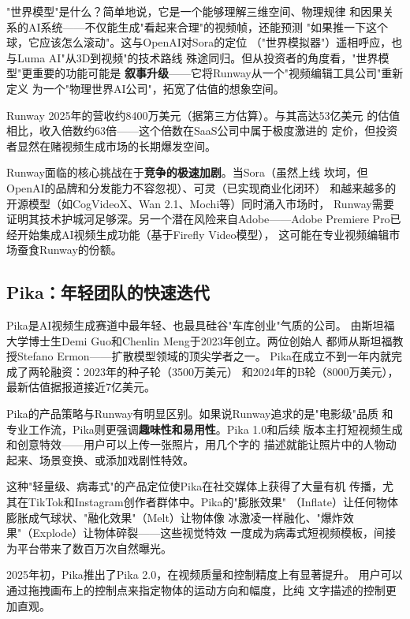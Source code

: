 "世界模型"是什么？简单地说，它是一个能够理解三维空间、物理规律
和因果关系的AI系统——不仅能生成"看起来合理"的视频帧，还能预测
"如果推一下这个球，它应该怎么滚动"。这与OpenAI对Sora的定位
（"世界模拟器"）遥相呼应，也与Luma AI"从3D到视频"的技术路线
殊途同归。但从投资者的角度看，"世界模型"更重要的功能可能是
\textbf{叙事升级}——它将Runway从一个"视频编辑工具公司"重新定义
为一个"物理世界AI公司"，拓宽了估值的想象空间。

Runway 2025年的营收约8400万美元（据第三方估算）。与其高达53亿美元
的估值相比，收入倍数约63倍——这个倍数在SaaS公司中属于极度激进的
定价，但投资者显然在赌视频生成市场的长期爆发空间。

Runway面临的核心挑战在于\textbf{竞争的极速加剧}。当Sora（虽然上线
坎坷，但OpenAI的品牌和分发能力不容忽视）、可灵（已实现商业化闭环）
和越来越多的开源模型（如CogVideoX、Wan 2.1、Mochi等）同时涌入市场时，
Runway需要证明其技术护城河足够深。另一个潜在风险来自Adobe——Adobe
Premiere Pro已经开始集成AI视频生成功能（基于Firefly Video模型），
这可能在专业视频编辑市场蚕食Runway的份额。

\subsection{Pika：年轻团队的快速迭代}
\label{subsec:pika}

Pika是AI视频生成赛道中最年轻、也最具硅谷"车库创业"气质的公司。
由斯坦福大学博士生Demi Guo和Chenlin Meng于2023年创立。两位创始人
都师从斯坦福教授Stefano Ermon——扩散模型领域的顶尖学者之一。
Pika在成立不到一年内就完成了两轮融资：2023年的种子轮（3500万美元）
和2024年的B轮（8000万美元），最新估值据报道接近7亿美元。

Pika的产品策略与Runway有明显区别。如果说Runway追求的是"电影级"品质
和专业工作流，Pika则更强调\textbf{趣味性和易用性}。Pika 1.0和后续
版本主打短视频生成和创意特效——用户可以上传一张照片，用几个字的
描述就能让照片中的人物动起来、场景变换、或添加戏剧性特效。

这种"轻量级、病毒式"的产品定位使Pika在社交媒体上获得了大量有机
传播，尤其在TikTok和Instagram创作者群体中。Pika的"膨胀效果"
（Inflate）让任何物体膨胀成气球状、"融化效果"（Melt）让物体像
冰激凌一样融化、"爆炸效果"（Explode）让物体碎裂——这些视觉特效
一度成为病毒式短视频模板，间接为平台带来了数百万次自然曝光。

2025年初，Pika推出了Pika 2.0，在视频质量和控制精度上有显著提升。
用户可以通过拖拽画布上的控制点来指定物体的运动方向和幅度，比纯
文字描述的控制更加直观。

